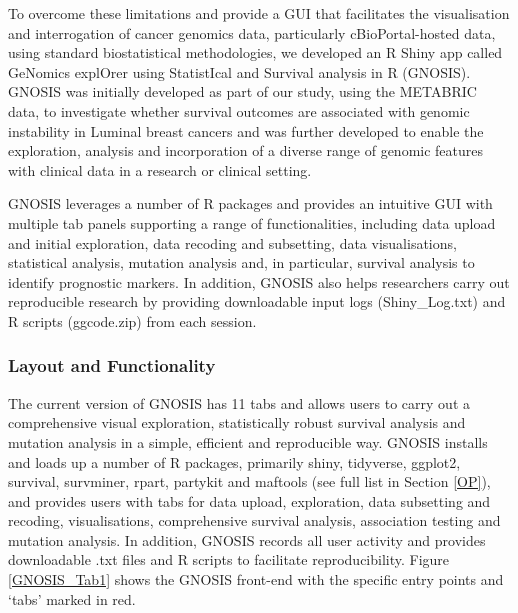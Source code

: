 To overcome these limitations and provide a GUI that facilitates the visualisation and interrogation of cancer genomics data, particularly cBioPortal-hosted data, using standard biostatistical methodologies, we developed an R Shiny app called GeNomics explOrer using StatistIcal and Survival analysis in R (GNOSIS). GNOSIS was initially developed as part of our study, using the METABRIC data, to investigate whether survival outcomes are associated with genomic instability in Luminal breast cancers \citep{King_2021} and was further developed to enable the exploration, analysis and incorporation of a diverse range of genomic features with clinical data in a research or clinical setting. 

GNOSIS leverages a number of R packages and provides an intuitive GUI with multiple tab panels supporting a range of functionalities, including data upload and initial exploration, data recoding and subsetting, data visualisations, statistical analysis, mutation analysis and, in particular, survival analysis to identify prognostic markers. In addition, GNOSIS also helps researchers carry out reproducible research by providing downloadable input logs (Shiny\_Log.txt) and R scripts (ggcode.zip) from each session.  

\subsubsection{Layout and Functionality} 
The current version of GNOSIS has 11 tabs and allows users to carry out a comprehensive visual exploration, statistically robust survival analysis and mutation analysis in a simple, efficient and reproducible way. GNOSIS installs and loads up a number of R packages, primarily shiny, tidyverse, ggplot2, survival, survminer, rpart, partykit and maftools \citep{hothorn_hornik_zeileis_2006, ctree1, ggplot2,  maftools, tidyverse, survminer, rpart, shiny, survival} (see full list in Section \ref{OP}), and provides users with tabs for data upload, exploration, data subsetting and recoding, visualisations, comprehensive survival analysis, association testing and mutation analysis. In addition, GNOSIS records all user activity and provides downloadable .txt files and R scripts to facilitate reproducibility. Figure \ref{GNOSIS_Tab1} shows the GNOSIS front-end with the specific entry points and ‘tabs’ marked in red.  

